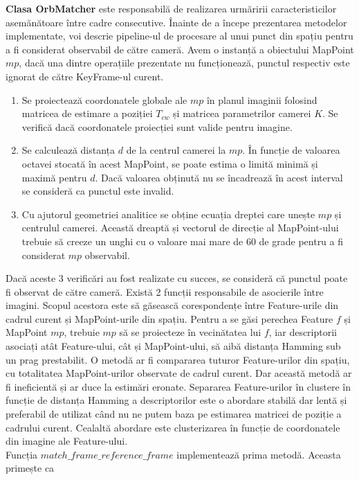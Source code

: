 \documentclass[12pt,a4paper]{report}
\begin{document}
\textbf{Clasa OrbMatcher} este responsabilă de realizarea urmăririi caracteristicilor asemănătoare între 
cadre consecutive. Înainte de a începe prezentarea metodelor implementate, voi descrie
pipeline-ul de procesare al unui punct din spațiu pentru a fi considerat observabil de 
către cameră. Avem o instanță a obiectului MapPoint $ mp $, dacă una dintre operațiile
prezentate nu funcționează, punctul respectiv este ignorat de către KeyFrame-ul curent.
\begin{enumerate}
    \item Se proiectează coordonatele globale ale $ mp $ în planul imaginii folosind matricea 
de estimare a poziției $ T_{cw} $ și matricea parametrilor camerei $ K $. Se verifică dacă 
coordonatele proiecției sunt valide pentru imagine.     
    \item Se calculează distanța $ d $ de la centrul camerei la $ mp $. În funcție de valoarea 
octavei stocată în acest MapPoint, se poate estima o limită minimă și maximă pentru $ d $. 
Dacă valoarea obținută nu se încadrează în acest interval se consideră ca punctul este invalid.
    \item Cu ajutorul geometriei analitice se obține ecuația dreptei care unește $ mp $ 
și centrulul camerei. Această dreaptă și vectorul de direcție al MapPoint-ului
trebuie să creeze un unghi cu o valoare mai mare de 60 de grade pentru a fi considerat $ mp $ observabil.
\end{enumerate} 
Dacă aceste 3 verificări au fost realizate cu succes, se consideră că punctul poate fi observat
de către cameră. Există 2 funcții responsabile de asocierile între imagini. Scopul acestora este
să găsească corespondențe între Feature-urile din cadrul curent și MapPoint-urile 
din spațiu. Pentru a se găsi perechea Feature $ f $ și MapPoint $ mp $, trebuie 
$ mp $ să se proiecteze în vecinătatea lui $ f $, iar descriptorii asociați atât Feature-ului, 
cât și  MapPoint-ului, să aibă distanța Hamming sub un  prag prestabilit. O metodă ar fi compararea tuturor
Feature-urilor din spațiu, cu totalitatea MapPoint-urilor observate de cadrul curent. Dar această metodă
ar fi ineficientă și ar duce la estimări eronate. Separarea Feature-urilor în clustere în funcție de distanța
Hamming a descriptorilor este o abordare stabilă dar lentă și preferabil de utilizat când nu ne putem baza pe
estimarea matricei de poziție a cadrului curent. Cealaltă abordare este clusterizarea în funcție de coordonatele
din imagine ale Feature-ului. \\
Funcția $ match\_frame\_reference\_frame $ implementează prima metodă. Aceasta primește ca 
\end{document}
